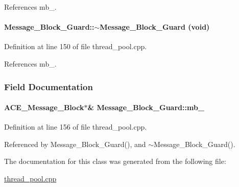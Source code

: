 References mb\_\-.\hypertarget{classMessage__Block__Guard_Message__Block__Guarda1}{
\paragraph[$\sim$Message\_\-Block\_\-Guard]{\setlength{\rightskip}{0pt plus 5cm}Message\_\-Block\_\-Guard::$\sim$Message\_\-Block\_\-Guard (void)}\hfill}
\label{classMessage__Block__Guard_Message__Block__Guarda1}




Definition at line 150 of file thread\_\-pool.cpp.

References mb\_\-.

\subsubsection{Field Documentation}
\hypertarget{classMessage__Block__Guard_Message__Block__Guardn0}{
\paragraph[mb\_\-]{\setlength{\rightskip}{0pt plus 5cm}ACE\_\-Message\_\-Block$\ast$\& Message\_\-Block\_\-Guard::mb\_\-}\hfill}
\label{classMessage__Block__Guard_Message__Block__Guardn0}




Definition at line 156 of file thread\_\-pool.cpp.

Referenced by Message\_\-Block\_\-Guard(), and $\sim$Message\_\-Block\_\-Guard().

The documentation for this class was generated from the following file:\begin{CompactItemize}
\item 
\hyperlink{thread__pool_8cpp}{thread\_\-pool.cpp}\end{CompactItemize}
